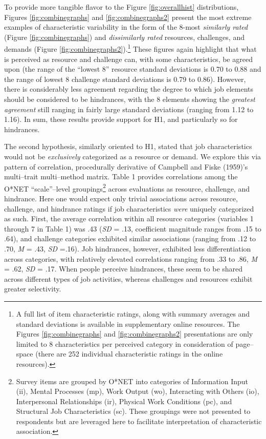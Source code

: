 \documentclass[
  man]{apa7}
\begin{document}
To provide more tangible flavor to the Figure \ref{fig:overallhist} distributions, Figures \ref{fig:combinegraphs} and \ref{fig:combinegraphs2} present the most extreme examples of characteristic variability in the form of the 8-most \emph{similarly rated} (Figure \ref{fig:combinegraphs}) and \emph{dissimilarly rated} resources, challenges, and demands (Figure \ref{fig:combinegraphs2}).\footnote{A full list of item characteristic ratings, along with summary averages and standard deviations is available in supplementary online resources. The Figures \ref{fig:combinegraphs} and \ref{fig:combinegraphs2} presentations are only limited to 8 characteristics per perceived category in consideration of page--space (there are 252 individual characteristic ratings in the online resources).} These figures again highlight that what is perceived as resource and challenge can, with some characteristics, be agreed upon (the range of the ``lowest 8'' resource standard deviations is 0.70 to 0.88 and the range of lowest 8 challenge standard deviations is 0.79 to 0.86). However, there is considerably less agreement regarding the degree to which job elements should be considered to be hindrances, with the 8 elements showing the \emph{greatest agreement} still ranging in fairly large standard deviations (ranging from 1.12 to 1.16). In sum, these results provide support for H1, and particularly so for hindrances.

The second hypothesis, similarly oriented to H1, stated that job characteristics would not be \emph{exclusively} categorized as a resource or demand. We explore this via pattern of correlation, procedurally derivative of Campbell and Fiske (1959)'s multi--trait multi--method matrix. Table 1 provides correlations among the O*NET ``scale''--level groupings\footnote{Survey items are grouped by O*NET into categories of Information Input (ii), Mental Processes (mp), Work Output (wo), Interacting with Others (io), Interpersonal Relationships (ir), Physical Work Conditions (pc), and Structural Job Characteristics (sc). These groupings were not presented to respondents but are leveraged here to facilitate interpretation of characteristic association.} across evaluations as resource, challenge, and hindrance. Here one would expect only trivial associations across resource, challenge, and hindrance ratings if job characteristics \emph{were} uniquely categorized as such. First, the average correlation within all resource categories (variables 1 through 7 in Table 1) was .43 (\emph{SD} = .13, coefficient magnitude ranges from .15 to .64), and challenge categories exhibited similar associations (ranging from .12 to .70, \emph{M} = .43, \emph{SD} =.16). Job hindrances, however, exhibited less differentiation across categories, with relatively elevated correlations ranging from .33 to .86, \emph{M} = .62, \emph{SD} = .17. When people perceive hindrances, these seem to be shared across different types of job activities, whereas challenges and resources exhibit greater selectivity.
\end{document}
